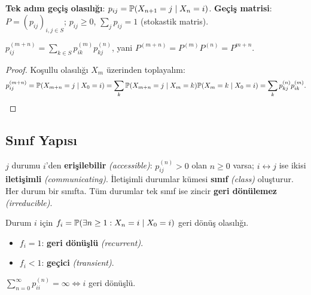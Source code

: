 \begin{tanim}\label{def:gecis_olasiliklari}
\textbf{Tek adım geçiş olasılığı}: $p_{ij} = \mathbb{P}(X_{n+1}=j\mid X_n=i)$.
\textbf{Geçiş matrisi}: $P = (p_{ij})_{i,j\in S}$; $p_{ij}\geq0$, $\sum_j p_{ij}=1$ (stokastik matris).
\end{tanim}

\begin{teorem}\label{thm:chapman_kolmogorov}
$p_{ij}^{(m+n)} = \sum_{k\in S} p_{ik}^{(m)}p_{kj}^{(n)}$, yani $P^{(m+n)} = P^{(m)}P^{(n)} = P^{m+n}$.
\end{teorem}

\begin{proof}
Koşullu olasılığı $X_m$ üzerinden toplayalım:
\[
  p_{ij}^{(m+n)} = \mathbb{P}(X_{m+n}=j\mid X_0=i)
  = \sum_k \mathbb{P}(X_{m+n}=j\mid X_m=k)\mathbb{P}(X_m=k\mid X_0=i)
  = \sum_k p_{kj}^{(n)}p_{ik}^{(m)}.
\]
\end{proof}

\subsection{Sınıf Yapısı}

\begin{tanim}\label{def:erisim}
$j$ durumu $i$'den \textbf{erişilebilir} \emph{(accessible)}: $p_{ij}^{(n)}>0$ olan $n\geq0$ varsa; $i\leftrightarrow j$ ise ikisi \textbf{iletişimli} \emph{(communicating)}. İletişimli durumlar kümesi \textbf{sınıf} \emph{(class)} oluşturur. Her durum bir sınıfta. Tüm durumlar tek sınıf ise zincir \textbf{geri dönülemez} \emph{(irreducible)}.
\end{tanim}

\begin{tanim}\label{def:geri_donusluluk}
Durum $i$ için $f_i = \mathbb{P}(\exists n\geq1: X_n=i\mid X_0=i)$ geri dönüş olasılığı.
\begin{itemize}
  \item $f_i=1$: \textbf{geri dönüşlü} \emph{(recurrent)}.
  \item $f_i<1$: \textbf{geçici} \emph{(transient)}.
\end{itemize}
\end{tanim}

\begin{teorem}\label{thm:geri_donus_krit}
$\sum_{n=0}^\infty p_{ii}^{(n)} = \infty \iff i$ geri dönüşlü.
\end{teorem}

